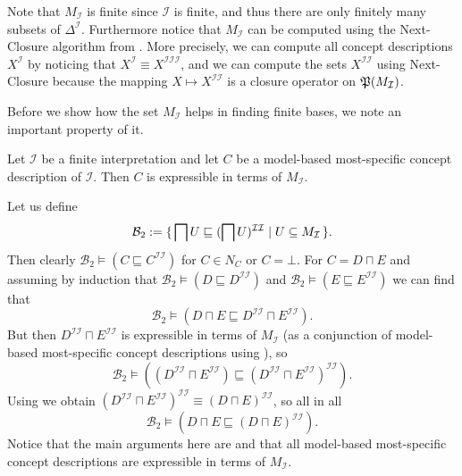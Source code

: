 Note that $M_{\mathcal{I}}$ is finite since $\mathcal{I}$ is finite, and thus there are
only finitely many subsets of $\Delta^{\mathcal{I}}$.  Furthermore notice that
$M_{\mathcal{I}}$ can be computed using the Next-Closure algorithm from
.  More precisely, we can compute all concept descriptions
$X^{\mathcal{I}}$ by noticing that $X^{\mathcal{I}} \equiv
X^{\mathcal{I}\mathcal{I}\mathcal{I}}$, and we can compute the sets
$X^{\mathcal{I}\mathcal{I}}$ using Next-Closure because the mapping $X \mapsto
X^{\mathcal{I}\mathcal{I}}$ is a closure operator on ${\mathfrak{P}(M_{\mathcal{I}})}$.

Before we show how the set $M_{\mathcal{I}}$ helps in finding finite bases, we note an
important property of it.

\begin{Lemma}
  \label{lem:mmsc-are-expressible-in-terms-of-M_I}
  Let $\mathcal{I}$ be a finite interpretation and let $C$ be a model-based most-specific
  concept description of $\mathcal{I}$.  Then $C$ is expressible in terms of
  $M_{\mathcal{I}}$.
\end{Lemma}

Let us define
\begin{equation}
  \label{eq:26}
  \mathcal{B}_2 := {\{\, \bigsqcap U \sqsubseteq (\bigsqcap U)^{\mathcal{I}\mathcal{I}}
    \mid U \subseteq M_{\mathcal{I}} \,\}}.
\end{equation}
Then clearly $\mathcal{B}_2 \models (C \sqsubseteq C^{\mathcal{I}\mathcal{I}})$ for $C \in
N_C$ or $C = \bot$.  For $C = D \sqcap E$ and assuming by induction that $\mathcal{B}_2
\models (D \sqsubseteq D^{\mathcal{I}\mathcal{I}})$ and $\mathcal{B}_2 \models (E
\sqsubseteq E^{\mathcal{I}\mathcal{I}})$ we can find that
\begin{equation*}
  \mathcal{B}_2 \models (D \sqcap E \sqsubseteq D^{\mathcal{I}\mathcal{I}} \sqcap E^{\mathcal{I}\mathcal{I}}).
\end{equation*}
But then $D^{\mathcal{I}\mathcal{I}} \sqcap E^{\mathcal{I}\mathcal{I}}$ is expressible in
terms of $M_{\mathcal{I}}$ (as a conjunction of model-based most-specific concept
descriptions using ), so
\begin{equation*}
  \mathcal{B}_2 \models ((D^{\mathcal{I}\mathcal{I}} \sqcap E^{\mathcal{I}\mathcal{I}})
  \sqsubseteq (D^{\mathcal{I}\mathcal{I}} \sqcap E^{\mathcal{I}\mathcal{I}})^{\mathcal{I}\mathcal{I}}).
\end{equation*}
Using  we obtain $(D^{\mathcal{I}\mathcal{I}} \sqcap
E^{\mathcal{I}\mathcal{I}})^{\mathcal{I}\mathcal{I}} \equiv (D \sqcap
E)^{\mathcal{I}\mathcal{I}}$, so all in all
\begin{equation*}
  \mathcal{B}_2 \models (D \sqcap E \sqsubseteq (D \sqcap E)^{\mathcal{I}\mathcal{I}}).
\end{equation*}
Notice that the main arguments here are  and that all
model-based most-specific concept descriptions are expressible in terms of
$M_{\mathcal{I}}$.

